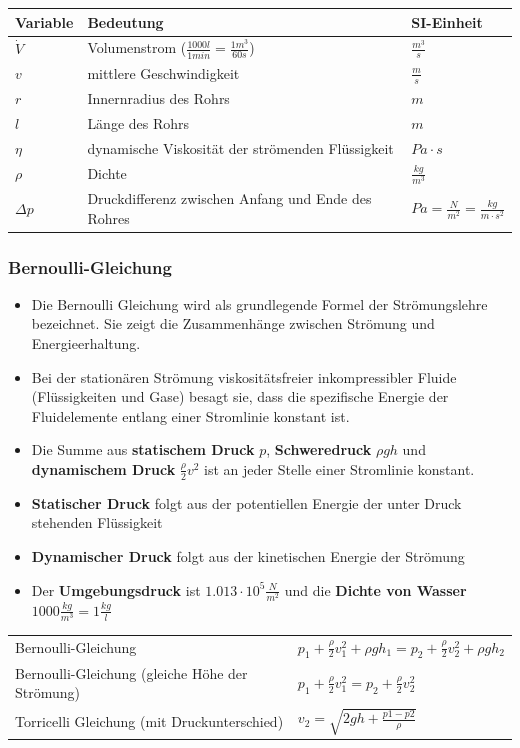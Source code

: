 \documentclass[
a4paper,
oneside,
landscape, 
8pt,
]{scrartcl}
\begin{document}
\begin{multicols*}{2}
\begin{tabbing}
	\begin{tabu} to \linewidth {l X l}
		Variable & Bedeutung & SI-Einheit \\
		\midrule
		$\dot{V}$ & Volumenstrom ($\frac{1000l}{1min} = \frac{1m^3}{60s}$)& $\frac{m^3}{s}$ \\
		$v$ & mittlere Geschwindigkeit & $\frac{m}{s}$ \\
		$r$ & Innernradius des Rohrs & $m$ \\
		$l$ & Länge des Rohrs & $m$ \\
		$\eta$ & dynamische Viskosität der strömenden Flüssigkeit & $Pa \cdot s$ \\
		$\rho$ & Dichte & $\frac{kg}{m^3}$ \\
		$\Delta p$ & Druckdifferenz zwischen Anfang und Ende des Rohres & $Pa = \frac{N}{m^2} = \frac{kg}{m\cdot s^2}$ \\
		\bottomrule
	\end{tabu}
\end{tabbing}


\subsubsection{Bernoulli-Gleichung}
\begin{itemize}
	\item Die Bernoulli Gleichung wird als grundlegende Formel der Strömungslehre bezeichnet. Sie zeigt die Zusammenhänge zwischen Strömung und Energieerhaltung.
	\item Bei der stationären Strömung viskosität­sfreier inkompressibler Fluide (Flüssigkeiten und Gase) besagt sie, dass die spezifische Energie der Fluidelemente entlang einer Stromlinie konstant ist.
	\item Die Summe aus \textbf{statischem Druck} $p$, \textbf{Schweredruck} $\rho g h$ und \textbf{dynamischem Druck} $\frac{\rho}{2}v^2$ ist an jeder Stelle einer Stromlinie konstant.
	\item \textbf{Statischer Druck} folgt aus der potentiellen Energie der unter Druck stehenden Flüssigkeit
	\item \textbf{Dynamischer Druck} folgt aus der kinetischen Energie der Strömung
	\item Der \textbf{Umgebungsdruck} ist $1.013 \cdot 10^5 \frac{N}{m^2}$ und die \textbf{Dichte von Wasser} $1000\frac{kg}{m^3} = 1 \frac{kg}{l}$
\end{itemize}

\begin{tabbing}
	\begin{tabu} to \linewidth {X l}
		\toprule
		Bernoulli-Gleichung & $p_1 + \frac{\rho}{2}v_1^2 + \rho g h_1 = p_2 + \frac{\rho}{2} v_2^2 + \rho g h_2 $ \\
		Bernoulli-Gleichung (gleiche Höhe der Strömung) & $p_1 + \frac{\rho}{2} v_1^2 = p_2 + \frac{\rho}{2} v_2^2$ \\
		Torricelli Gleichung (mit Druckunterschied) & $v_2 = \sqrt{2gh + \frac{p1-p2}{\rho}}$ \\
	\end{tabu}
\end{tabbing}


\end{multicols*}
\end{document}
